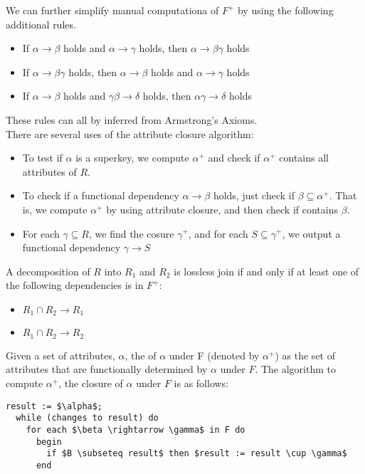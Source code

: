 \documentclass{article}
\begin{document}
We can further simplify manual computationa of $F^{+}$ by using the following additional rules. 
\begin{itemize}
  \item If $\alpha \rightarrow \beta$ holds and $\alpha \rightarrow \gamma$ holds, then $\alpha \rightarrow \beta\gamma$ holds \hfill {}
  \item If $\alpha \rightarrow \beta\gamma$ holds, then $\alpha \rightarrow \beta$ holds and $\alpha \rightarrow \gamma$ holds \hfill {}  
  \item If $\alpha \rightarrow \beta$ holds and $\gamma\beta \rightarrow \delta$ holds, then $\alpha \gamma \rightarrow \delta$ holds \hfill {}
\end{itemize}
These rules can all by inferred from Armstrong's Axioms. \\ 

There are several uses of the attribute closure algorithm:
\begin{itemize} 
  \item To test if $\alpha$ is a superkey, we compute $\alpha^{+}$ and check if $\alpha^{+}$ contains all attributes of $R$. 
  \item To check if a functional dependency $\alpha \rightarrow \beta$ holds, just check if $\beta \subseteq \alpha^{+}$. That is, we compute $\alpha^{+}$ by using attribute closure, and then check if contains $\beta$. 
  \item For each $\gamma \subseteq R$, we find the cosure $\gamma^{+}$, and for each $S \subseteq \gamma^{+}$, we output a functional dependency $\gamma \rightarrow S$
\end{itemize}

\begin{definition}
  A decomposition of $R$ into $R_1$ and $R_2$ is lossless join if and only if at least one of the following dependencies is in $F^{+}$: 
  \begin{itemize}
    \item $R_1 \cap R_2 \rightarrow R_1$ 
    \item $R_1 \cap R_2 \rightarrow R_2$
  \end{itemize}
\end{definition}

Given a set of attributes, $\alpha$, the  of $\alpha$ under F (denoted by $\alpha^{+}$) as the set of attributes that are functionally determined by $\alpha$ under $F$. The algorithm to compute $\alpha^{+}$, the closure of $\alpha$ under $F$ is as follows: 
\begin{lstlisting}[mathescape=true]
  result := $\alpha$;
  while (changes to result) do 
    for each $\beta \rightarrow \gamma$ in F do 
      begin 
        if $B \subseteq result$ then $result := result \cup \gamma$ 
      end 
\end{lstlisting}
\end{document}
